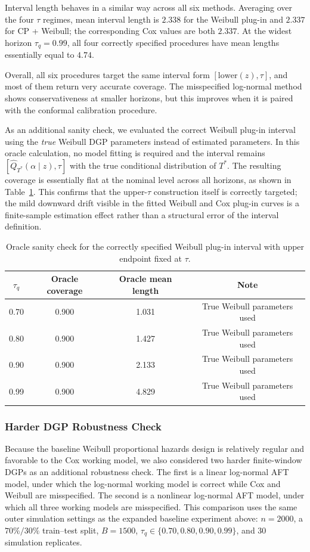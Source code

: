 \documentclass[12pt]{article}
\makeatletter
\let\thesis@subsection\subsubsection
\renewcommand{\subsection}{\thesis@subsection}
\makeatother
\begin{document}
{Interval length behaves in a similar way across all six methods. Averaging over the four $\tau$ regimes, mean interval length is $2.338$ for the Weibull plug-in and $2.337$ for CP + Weibull; the corresponding Cox values are both $2.337$. At the widest horizon $\tau_q=0.99$, all four correctly specified procedures have mean lengths essentially equal to $4.74$.

Overall, all six procedures target the same interval form $[\text{lower}(z),\tau]$, and most of them return very accurate coverage. The misspecified log-normal method shows conservativeness at smaller horizons, but this improves when it is paired with the conformal calibration procedure.

As an additional sanity check, we evaluated the correct Weibull plug-in interval using the \emph{true} Weibull DGP parameters instead of estimated parameters. In this oracle calculation, no model fitting is required and the interval remains $[\widehat Q_{T^*}(\alpha\mid z),\tau]$ with the true conditional distribution of $T^*$. The resulting coverage is essentially flat at the nominal level across all horizons, as shown in Table~\ref{tab:expanded_baseline_oracle}. This confirms that the upper-$\tau$ construction itself is correctly targeted; the mild downward drift visible in the fitted Weibull and Cox plug-in curves is a finite-sample estimation effect rather than a structural error of the interval definition.

\begin{table}[htbp]
\centering
\small
\caption{Oracle sanity check for the correctly specified Weibull plug-in interval with upper endpoint fixed at $\tau$.}
\label{tab:expanded_baseline_oracle}
\begin{tabular}{@{}cccc@{}}
\toprule
$\tau_q$ & Oracle coverage & Oracle mean length & Note \\
\midrule
0.70 & 0.900 & 1.031 & True Weibull parameters used \\
0.80 & 0.900 & 1.427 & True Weibull parameters used \\
0.90 & 0.900 & 2.133 & True Weibull parameters used \\
0.99 & 0.900 & 4.829 & True Weibull parameters used \\
\bottomrule
\end{tabular}
\end{table}

\subsection{Harder DGP Robustness Check}
Because the baseline Weibull proportional hazards design is relatively regular and favorable to the Cox working model, we also considered two harder finite-window DGPs as an additional robustness check. The first is a linear log-normal AFT model, under which the log-normal working model is correct while Cox and Weibull are misspecified. The second is a nonlinear log-normal AFT model, under which all three working models are misspecified. This comparison uses the same outer simulation settings as the expanded baseline experiment above: $n=2000$, a $70\%/30\%$ train--test split, $B=1500$, $\tau_q\in\{0.70,0.80,0.90,0.99\}$, and $30$ simulation replicates.

}
\end{document}
